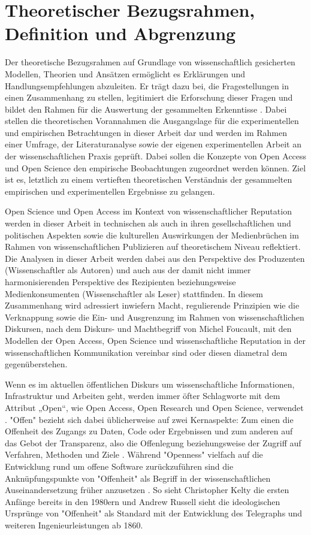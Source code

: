 \chapter{Theoretischer Bezugsrahmen, Definition und Abgrenzung} 

Der theoretische Bezugsrahmen auf Grundlage von wissenschaftlich gesicherten Modellen, Theorien und Ansätzen ermöglicht es Erklärungen und Handlungsempfehlungen abzuleiten\cite{martin_2007_wissenschaftstheorie}. Er trägt dazu bei, die Fragestellungen in einen Zusammenhang zu stellen, legitimiert die Erforschung dieser Fragen und bildet den Rahmen für die Auswertung der gesammelten Erkenntisse \cite{suchen}. Dabei stellen die theoretischen Vorannahmen die Ausgangslage für die experimentellen und empirischen Betrachtungen in dieser Arbeit dar und werden im Rahmen einer Umfrage, der Literaturanalyse sowie der eigenen experimentellen Arbeit an der wissenschaftlichen Praxis geprüft. Dabei sollen die Konzepte von Open Access und Open Science den empirische Beobachtungen zugeordnet werden können. Ziel ist es, letztlich zu einem vertieften theoretischen Verständnis der gesammelten empirischen und experimentellen Ergebnisse zu gelangen. 

Open Science und Open Access im Kontext von wissenschaftlicher Reputation werden in dieser Arbeit in technischen als auch in ihren gesellschaftlichen und politischen Aspekten sowie die kulturellen Auswirkungen der Medienbrüchen im Rahmen von wissenschaftlichen Publizieren auf theoretischem Niveau reflektiert. Die Analysen in dieser Arbeit werden dabei aus den Perspektive des Produzenten (Wissenschaftler als Autoren) und auch aus der damit nicht immer harmonisierenden Perspektive des Rezipienten beziehungsweise Medienkonsumenten (Wissenschaftler als Leser) stattfinden. In diesem Zusammenhang wird adressiert inwiefern Macht, regulierende Prinzipien wie die Verknappung sowie die Ein- und Ausgrenzung im Rahmen von wissenschaftlichen Diskursen, nach dem Diskurs- und Machtbegriff von Michel Foucault, mit den Modellen der Open Access, Open Science und wissenschaftliche Reputation in der wissenschaftlichen Kommunikation vereinbar sind oder diesen diametral dem gegenüberstehen. 

Wenn es im aktuellen öffentlichen Diskurs um wissenschaftliche Informationen, Infrastruktur und Arbeiten geht, werden immer öfter Schlagworte mit dem Attribut „Open“, wie Open Access, Open Research und Open Science, verwendet \cite{bunz_2014} \cite{schulze_2013_open}. "Offen" bezieht sich dabei üblicherweise auf zwei Kernaspekte: Zum einen die Offenheit des Zugangs zu Daten, Code oder Ergebnissen und zum anderen auf das Gebot der Transparenz, also die Offenlegung beziehungsweise der Zugriff auf Verfahren, Methoden und Ziele \cite{schulze_2013_open}. Während "Openness" vielfach auf die Entwicklung rund um offene Software zurückzuführen sind die Anknüpfungspunkte von "Offenheit" als Begriff in der wissenschaftlichen Auseinandersetzung früher anzusetzen \cite{Tkacz_2014}. So sieht Christopher Kel­ty die ersten Anfänge bereits in den 1980ern \cite{kelty_2008_two_bits} und Andrew Russell sieht die ideologischen Ursprünge von "Offenheit" als Standard mit der Entwicklung des Telegraphs und weiteren Ingenieurleistungen ab 1860\cite{Russell_2014}.

